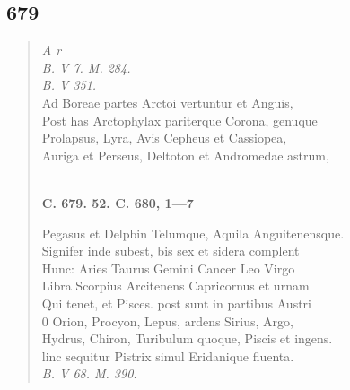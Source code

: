 \documentclass[11pt, a4paper]{report}
\begin{document}
            \subsection*{679}
      \begin{verse}
      \textit{A r} \\ \textit{B. V 7. M. 284.} \\ \textit{B. V 351.} \\ Ad Boreae partes Arctoi vertuntur et Anguis, \\ Post has Arctophylax pariterque Corona, genuque \\ Prolapsus, Lyra, Avis Cepheus et Cassiopea, \\ Auriga et Perseus, Deltoton et Andromedae astrum, \\ 
        ﻿\pagebreak 
    \begin{center} \textbf{C. 679. 52. C. 680, 1—7} \end{center} \marginpar{[155]} Pegasus et Delpbin Telumque, Aquila Anguitenensque. \\ Signifer inde subest, bis sex et sidera complent \\ Hunc: Aries Taurus Gemini Cancer Leo Virgo \\ Libra Scorpius Arcitenens Capricornus et urnam \\ Qui tenet, et Pisces. post sunt in partibus Austri \\ 0 Orion, Procyon, Lepus, ardens Sirius, Argo, \\ Hydrus, Chiron, Turibulum quoque, Piscis et ingens. \\ linc sequitur Pistrix simul Eridanique fluenta. \\ \textit{B. V 68. M. 390.} \\ 
      \end{verse}
  
\end{document}
